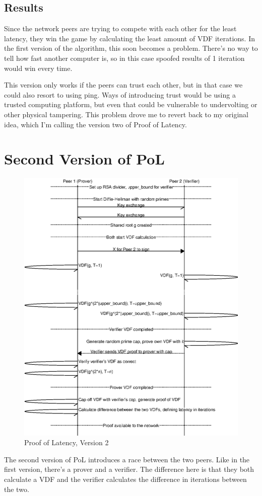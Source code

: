 \subsection{Results}
Since the network peers are trying to compete with each other for the least latency, they win the game by calculating the least amount of VDF iterations. In the first version of the algorithm, this soon becomes a problem. There's no way to tell how fast another computer is, so in this case spoofed results of 1 iteration would win every time.

This version only works if the peers can trust each other, but in that case we could also resort to using ping. Ways of introducing trust would be using a trusted computing platform, but even that could be vulnerable to undervolting or other physical tampering. This problem drove me to revert back to my original idea, which I'm calling the version two of Proof of Latency.

\section{Second Version of PoL}
\begin{figure}
	\includegraphics[width=\textwidth]{pictures/pol2_diagram.eps}
	\caption{Proof of Latency, Version 2}
	\label{PoL Diagram 2}
\end{figure}
The second version of PoL introduces a race between the two peers. Like in the first version, there's a prover and a verifier. The difference here is that they both calculate a VDF and the verifier calculates the difference in iterations between the two.

